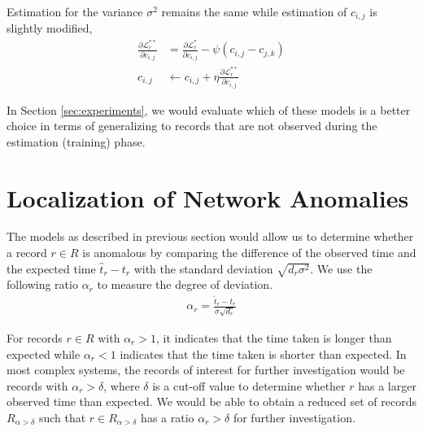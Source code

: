 \documentclass{sig-alternate}
\begin{document}
Estimation for the variance $\sigma^2$ remains the same while estimation of $c_{i,j}$ is slightly modified,
\begin{align*}
	\frac{\partial \mathcal{L}^{**}_r}{\partial c_{i,j}} &= \frac{\partial \mathcal{L}^*_r}{\partial c_{i,j}} - \psi (c_{i,j} - c_{j,k}) \\
	c_{i,j} &\leftarrow c_{i,j} + \eta \frac{\partial \mathcal{L}^{**}_r}{\partial c_{i,j}}
\end{align*}

In Section \ref{sec:experiments}, we would evaluate which of these models is a better choice in terms of generalizing to records that are not observed during the estimation (training) phase.

\section{Localization of Network Anomalies}
\label{sec:localization}

The models as described in previous section would allow us to determine whether a record $r \in R$ is anomalous by comparing the difference of the observed time and the expected time $\hat{t}_r - t_r$ with the standard deviation $\sqrt{d_r \sigma^2}$. We use the following ratio $\alpha_r$ to measure the degree of deviation.
\begin{align*}
	\alpha_r = \frac{\hat{t}_r - t_r}{\sigma \sqrt{d_r}}
\end{align*}

For records $r \in R$ with $\alpha_r > 1$, it indicates that the time taken is longer than expected while $\alpha_r < 1$ indicates that the time taken is shorter than expected. In most complex systems, the records of interest for further investigation would be records with $\alpha_r > \delta$, where $\delta$ is a cut-off value to determine whether $r$ has a larger observed time than expected. We would be able to obtain a reduced set of records $R_{\alpha > \delta}$ such that $r \in R_{\alpha > \delta}$ has a ratio $\alpha_r > \delta$ for further investigation.
\end{document}
